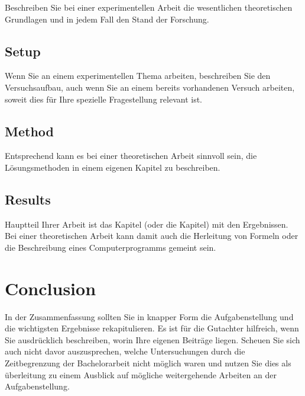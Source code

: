 \documentclass[a4paper,11pt,oneside,final,english,toc=bib]{scrbook}
\begin{document}
Beschreiben Sie bei einer experimentellen Arbeit die wesentlichen 
theoretischen Grundlagen und in jedem Fall den Stand der Forschung.

\section{Setup}

Wenn Sie an einem experimentellen Thema arbeiten, beschreiben Sie 
den Versuchsaufbau, auch wenn Sie an einem bereits vorhandenen 
Versuch arbeiten, soweit dies für Ihre spezielle Fragestellung 
relevant ist. 

\section{Method}

Entsprechend kann es bei einer theoretischen Arbeit sinnvoll sein,
die Lösungsmethoden in einem eigenen Kapitel zu beschreiben.

\section{Results}

Hauptteil Ihrer Arbeit ist das Kapitel (oder die Kapitel) mit den 
Ergebnissen. Bei einer theoretischen Arbeit kann damit auch 
die Herleitung von Formeln oder die Beschreibung eines Computerprogramms 
gemeint sein.

\chapter{Conclusion}

In der Zusammenfassung sollten Sie in knapper Form die Aufgabenstellung 
und die wichtigsten Ergebnisse rekapitulieren. Es ist für die 
Gutachter hilfreich, wenn Sie ausdrücklich beschreiben, worin 
Ihre eigenen Beiträge liegen. Scheuen Sie sich auch nicht davor 
auszusprechen, welche Untersuchungen durch die Zeitbegrenzung der 
Bachelorarbeit nicht möglich waren und nutzen Sie dies als 
überleitung zu einem Ausblick auf mögliche weitergehende 
Arbeiten an der Aufgabenstellung.

\appendix

\end{document}
